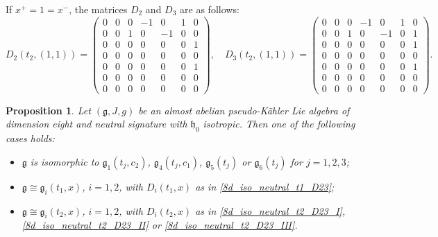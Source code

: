 \documentclass{article}
\newtheorem{proposition}[theorem]{Proposition}
\theoremstyle{definition}
\newcommand{\frg}{\mathfrak{g}}
\newcommand{\frh}{\mathfrak{h}}
\begin{document}
\begin{itemize}
    If $x^+=1=x^-$, the matrices $D_2$ and $D_3$ are as follows: \begin{equation}\label{8d_iso_neutral_t2_D23_III}
    D_2(t_2,(1,1))=\left(\begin{smallmatrix}
        0 & 0 & 0 & -1 & 0 & 1 & 0 \\
        0 & 0 & 1 & 0 & -1 & 0 & 0 \\
        0 & 0 & 0 & 0 & 0 & 0 & 1 \\
        0 & 0 & 0 & 0 & 0 & 0 & 0 \\
        0 & 0 & 0 & 0 & 0 & 0 & 1 \\
        0 & 0 & 0 & 0 & 0 & 0 & 0 \\
        0 & 0 & 0 & 0 & 0 & 0 & 0
    \end{smallmatrix}\right),\quad D_3(t_2,(1,1))=\left(\begin{smallmatrix}
        0 & 0 & 0 & -1 & 0 & 1 & 0 \\
        0 & 0 & 1 & 0 & -1 & 0 & 1 \\
        0 & 0 & 0 & 0 & 0 & 0 & 1 \\
        0 & 0 & 0 & 0 & 0 & 0 & 0 \\
        0 & 0 & 0 & 0 & 0 & 0 & 1 \\
        0 & 0 & 0 & 0 & 0 & 0 & 0 \\
        0 & 0 & 0 & 0 & 0 & 0 & 0
    \end{smallmatrix}\right).\end{equation}
\end{itemize}

\begin{proposition}
    Let $(\frg,J,g)$ be an almost abelian pseudo-Kähler Lie algebra of dimension eight and neutral signature with $\frh_0$ isotropic. Then one of the following cases holds: \begin{itemize}
        \item $\frg$ is isomorphic to $\frg_1(t_j,c_2)$, $\frg_4(t_j,c_1)$, $\frg_5(t_j)$ or $\frg_6(t_j)$ for $j=1,2,3$;
        \item $\frg\cong\frg_i(t_1,x)$, $i=1,2$, with $D_i(t_1,x)$ as in \eqref{8d_iso_neutral_t1_D23};
        \item $\frg\cong\frg_i(t_2,x)$, $i=1,2$, with $D_i(t_2,x)$ as in \eqref{8d_iso_neutral_t2_D23_I}, \eqref{8d_iso_neutral_t2_D23_II} or \eqref{8d_iso_neutral_t2_D23_III}.
    \end{itemize}
\end{proposition}

\end{document}
